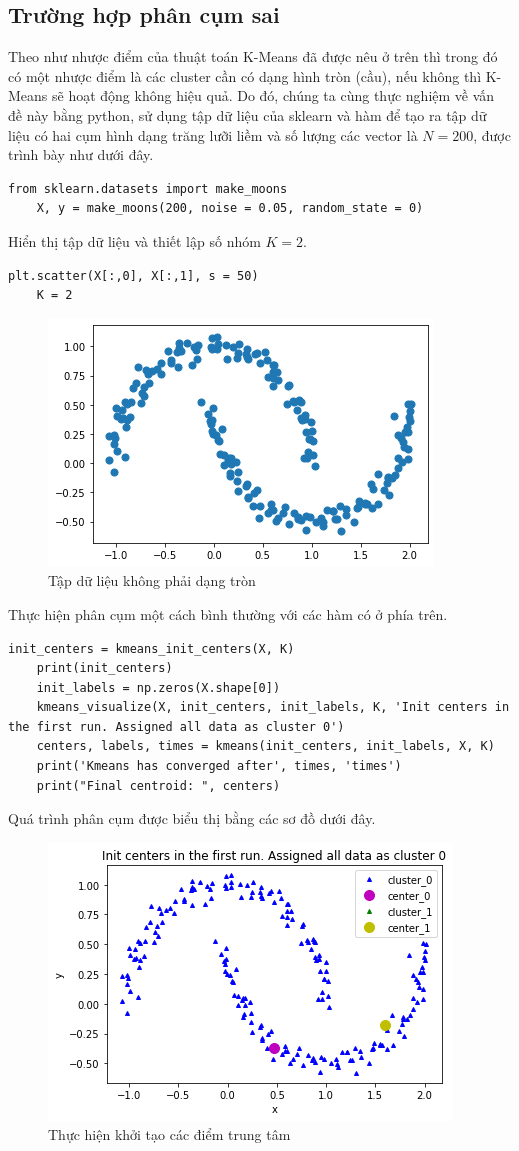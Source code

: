 \documentclass{article}
\begin{document}
	\subsection{Trường hợp phân cụm sai} %
	\label{sub:trường_hợp_phân_cụm_sai}
	Theo như nhược điểm của thuật toán K-Means đã được nêu ở trên thì trong đó có một nhược điểm là các cluster cần có dạng hình tròn (cầu), nếu không thì K-Means sẽ hoạt động không hiệu quả. Do đó, chúng ta cùng thực nghiệm về vấn đề này bằng python, sử dụng tập dữ liệu của sklearn và hàm {} để tạo ra tập dữ liệu có hai cụm hình dạng trăng lưỡi liềm và số lượng các vector là $N = 200$, được trình bày như dưới đây.
	\begin{lstlisting}[style=myPythonStyle]
	from sklearn.datasets import make_moons
	X, y = make_moons(200, noise = 0.05, random_state = 0)
	\end{lstlisting}
	Hiển thị tập dữ liệu và thiết lập số nhóm $K = 2$.
	\begin{lstlisting}[style=myPythonStyle]
	plt.scatter(X[:,0], X[:,1], s = 50)
	K = 2
	\end{lstlisting}
	\newpage
	\begin{figure}[h]
		\centering
		\includegraphics[width=0.6\linewidth]{img/moons}
		\caption{Tập dữ liệu không phải dạng tròn}
	\end{figure}
	Thực hiện phân cụm một cách bình thường với các hàm có ở phía trên.
	\begin{lstlisting}[style=myPythonStyle]
	init_centers = kmeans_init_centers(X, K)
	print(init_centers)
	init_labels = np.zeros(X.shape[0])
	kmeans_visualize(X, init_centers, init_labels, K, 'Init centers in the first run. Assigned all data as cluster 0')
	centers, labels, times = kmeans(init_centers, init_labels, X, K)
	print('Kmeans has converged after', times, 'times')
	print("Final centroid: ", centers)
	\end{lstlisting}
	Quá trình phân cụm được biểu thị bằng các sơ đồ dưới đây.
	\begin{figure}[h]
		\centering
		\includegraphics[width=0.6\linewidth]{img/moons1}
		\caption{Thực hiện khởi tạo các điểm trung tâm}
	\end{figure}
\end{document}
